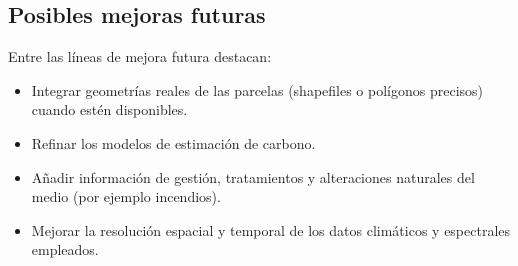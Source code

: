 \subsection*{Posibles mejoras futuras}

Entre las líneas de mejora futura destacan:

\begin{itemize}
    \item Integrar geometrías reales de las parcelas (shapefiles o polígonos precisos) cuando estén disponibles.
    \item Refinar los modelos de estimación de carbono.
    \item Añadir información de gestión, tratamientos y alteraciones naturales del medio (por ejemplo incendios).
    \item Mejorar la resolución espacial y temporal de los datos climáticos y espectrales empleados.
\end{itemize}


